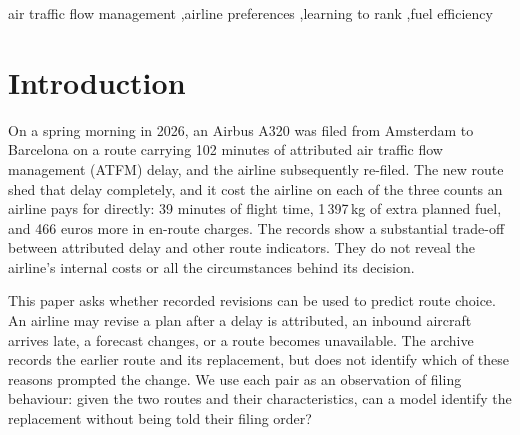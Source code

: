 \documentclass[preprint,authoryear,12pt]{elsarticle}
\begin{document}
\begin{frontmatter}
\begin{abstract}
single-indicator rule and 57.5\,\% for the strongest logistic baseline.
Accuracy reaches 94.9\,\% on the fifth of pairs with the highest
confidence. Matched examples of retained routes improve predictions on
a smaller stay-pair test set. A retrospective policy then selects
lower-fuel routes above a calibrated probability threshold. At an
operating point targeting 80\,\% precision, 79.2\,\% of selections
match the subsequent filing and account for 20.1\,kilotonnes of
planned-fuel differences over the quarter. These results establish
useful prediction and confidence-based selection from revision records.
The fuel total describes historical choices; acceptance of actual
proposals and additional savings require prospective evaluation.

\end{abstract}

\begin{keyword}
air traffic flow management \sep airline preferences \sep learning to
rank \sep fuel efficiency
\end{keyword}

\end{frontmatter}

\section{Introduction}
\label{sec:intro}

On a spring morning in 2026, an Airbus A320 was filed from Amsterdam to
Barcelona on a route carrying 102 minutes of attributed air traffic
flow management (ATFM) delay, and the airline subsequently re-filed.
The new route shed that delay completely, and it cost the airline on
each of the three counts an airline pays for directly: 39 minutes of
flight time, 1\,397\,kg of extra planned fuel, and 466 euros more in
en-route charges. The records show a substantial trade-off between attributed delay and
other route indicators. They do not reveal the airline's internal costs
or all the circumstances behind its decision.

This paper asks whether recorded revisions can be used to predict route
choice. An airline may revise a plan after a delay is attributed, an
inbound aircraft arrives late, a forecast changes, or a route becomes
unavailable. The archive records the earlier route and its replacement,
but does not identify which of these reasons prompted the change. We
use each pair as an observation of filing behaviour: given the two routes
and their characteristics, can a model identify the replacement without
being told their filing order?
\end{document}

